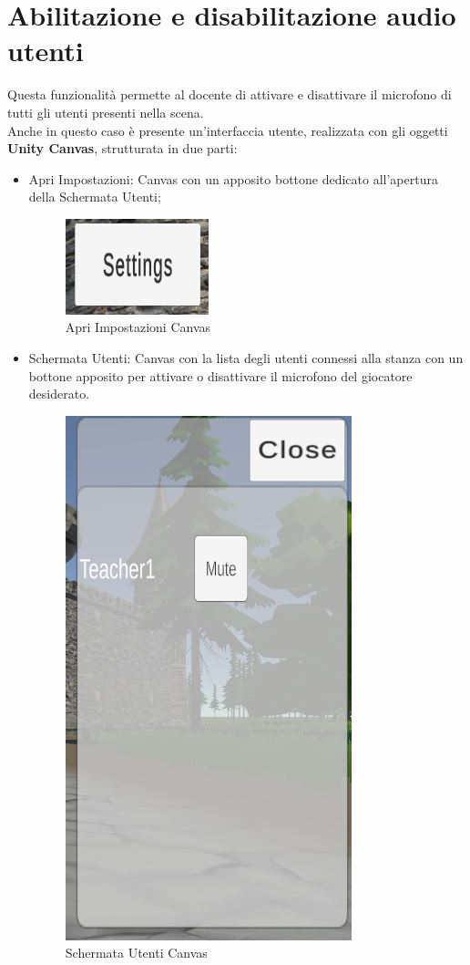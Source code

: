 \section{Abilitazione e disabilitazione audio utenti}
Questa funzionalità permette al docente di attivare e disattivare il microfono di tutti gli utenti presenti nella scena.
\\Anche in questo caso è presente un'interfaccia utente, realizzata con gli oggetti \textbf{Unity Canvas}, strutturata in due parti:
\begin{itemize}
    \item Apri Impostazioni: Canvas con un apposito bottone dedicato all'apertura della Schermata Utenti;
    \begin{figure}[H]
    \centering
    \includegraphics[scale = 1]{Immagini/settings.jpg}
    \caption{Apri Impostazioni Canvas}
    \label{fig:my_label}
\end{figure}
    \item Schermata Utenti: Canvas con la lista degli utenti connessi alla stanza con un bottone apposito per attivare o disattivare il microfono del giocatore desiderato.
    \begin{figure}[H]
    \centering
    \includegraphics[scale = 1]{Immagini/MutareSmutare.jpg}
    \caption{Schermata Utenti Canvas}
    \label{fig:my_label}
\end{figure}
\end{itemize}
